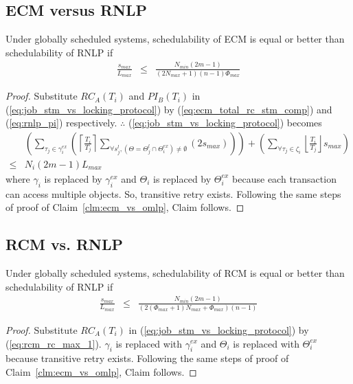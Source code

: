 \subsection{ECM versus RNLP}\label{subsec:ecm_vs_rnlp}
%
\begin{clm}\label{clm:ecm_vs_rnlp}
%
Under globally scheduled systems, schedulability of ECM is equal or
better than schedulability of RNLP if 
%
\begin{eqnarray}
\frac{s_{max}}{L_{max}} & \le & \frac{N_{min}\left(2m-1\right)}{\left(2N_{max}+1\right)(n-1)\Phi_{max}}\label{eq:ecm_rnlp_cmp_final}
\end{eqnarray}
%
\end{clm}
%
\begin{proof}
%
Substitute $RC_{A}(T_{i})$ and $PI_{B}(T_{i})$ in (\ref{eq:job_stm_vs_locking_protocol})
by (\ref{eq:ecm_total_rc_stm_comp}) and (\ref{eq:rnlp_pi}) respectively. $\therefore$ (\ref{eq:job_stm_vs_locking_protocol}) becomes 
%
\begin{eqnarray}
 & \left(\sum_{\tau_{j}\in\gamma_{i}^{ex}}\left(\left\lceil\frac{T_{i}}{T_{j}}\right\rceil\sum_{\forall s_{j}^{l}, \left(\Theta=\Theta_j^l \cap \Theta_i^{ex}\right) \neq \emptyset}\left(2s_{max}\right)\right)\right) +
\left( \sum_{\forall \tau_j \in \zeta_i} \left\lfloor \frac{T_i}{T_j}\right\rfloor s_{max} \right) \nonumber \\
\le & N_{i}\left(2m-1\right)L_{max}\label{eq:ecm_rnlp_cmp_1}
\end{eqnarray}
%
where $\gamma_i$ is replaced by $\gamma_i^{ex}$ and $\Theta_i$ is replaced by $\Theta_i^{ex}$ because each transaction can access multiple objects. So, transitive retry exists. Following the same steps of proof of Claim~\ref{clm:ecm_vs_omlp}, Claim follows.
%
\end{proof}
%
\subsection{RCM vs. RNLP}\label{subsec:rcm_vs_rnlp}
%
\begin{clm}\label{clm:rcm_vs_rnlp}
%
Under globally scheduled systems, schedulability of RCM is equal or
better than schedulability of RNLP if 
\begin{eqnarray}
\frac{s_{max}}{L_{max}} & \le & \frac{N_{min}\left(2m-1\right)}{\left(2\left(\Phi_{max}+1\right)N_{max}+\Phi_{max}\right)(n-1)}
\label{eq:rcm_rnlp_cmp_final}
\end{eqnarray}
%
\end{clm}
%
\begin{proof}
%
Substitute $RC_{A}(T_{i})$ in (\ref{eq:job_stm_vs_locking_protocol})
by (\ref{eq:rcm_rc_max_1}). $\gamma_i$ is replaced with $\gamma_i^{ex}$ and $\Theta_i$ is replaced with $\Theta_i^{ex}$ because transitive retry exists. Following the same steps of proof of Claim~\ref{clm:ecm_vs_omlp}, Claim follows.
%
\end{proof}
%
